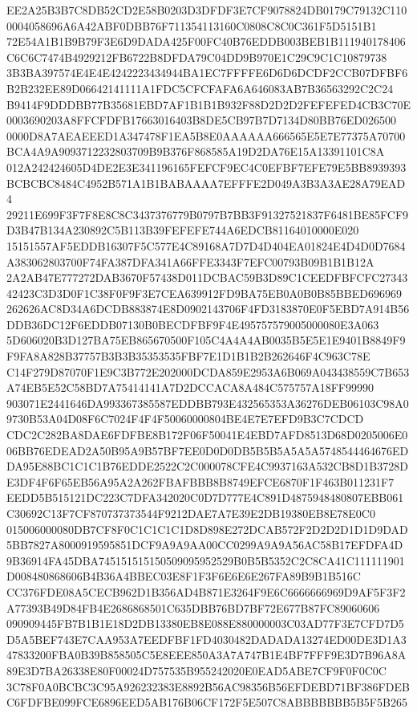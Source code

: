 \documentclass[UTF8,fontset=fandol,zihao=-4,a4paper]{ctexart}
\begin{document}
{{EE2A25B3B7C8DB52CD2E58B0203D3DFDF3E7CF9078824DB0179C79132C1100004058696A6A42ABF0DBB76F711354113160C0808C8C0C361F5D5151B1
72E54A1B1B9B79F3E6D9DADA425F00FC40B76EDDB003BEB1B111940178406C6C6C7474B4929212FB6722B8DFDA79C04DD9B970E1C29C9C1C10879738
3B3BA397574E4E4E4242223434944BA1EC7FFFFE6D6D6DCDF2CCB07DFBF6B2B232EE89D06642141111A1FDC5CFCFAFA6A646083AB7B36563292C2C24
B9414F9DDDBB77B35681EBD7AF1B1B1B932F88D2D2D2FEFEFED4CB3C70E0003690203A8FFCFDFB17663016403B8DE5CB97B7D7134D80BB76ED026500
0000D8A7AEAEEED1A347478F1EA5B8E0AAAAAA666565E5E7E77375A70700BCA4A9A9093712232803709B9B376F868585A19D2DA76E15A13391101C8A
012A242424605D4DE2E3E341196165FEFCF9EC4C0EFBF7EFE79E5BB8939393BCBCBC8484C4952B571A1B1BABAAAA7EFFFE2D049A3B3A3AE28A79EAD4
29211E699F3F7F8E8C8C3437376779B0797B7BB3F91327521837F6481BE85FCF9D3B47B134A230892C5B113B39FEFEFE744A6EDCB81164010000E020
15151557AF5EDDB16307F5C577E4C89168A7D7D4D404EA01824E4D4D0D7684A383062803700F74FA387DFA341A66FFE3343F7EFC00793B09B1B1B12A
2A2AB47E777272DAB3670F57438D011DCBAC59B3D89C1CEEDFBFCFC2734342423C3D3D0F1C38F0F9F3E7CEA639912FD9BA75EB0A0B0B85BBED696969
262626AC8D34A6DCDB883874E8D0902143706F4FD3183870E0F5EBD7A914B56DDB36DC12F6EDDB07130B0BECDFBF9F4E495757579005000080E3A063
5D606020B3D127BA75EB865670500F105C4A4A4AB0035B5E5E1E9401B8849F9F9FA8A828B37757B3B3B35353535FBF7E1D1B1B2B262646F4C963C78E
C14F279D87070F1E9C3B772E202000DCDA859E2953A6B069A043438559C7B653A74EB5E52C58BD7A75414141A7D2DCCACA8A484C575757A18FF99990
903071E2441646DA993367385587EDDBB793E432565353A36276DEB06103C98A09730B53A04D08F6C7024F4F4F50060000804BE4E7E7EFD9B3C7CDCD
CDC2C282BA8DAE6FDFBE8B172F06F50041E4EBD7AFD8513D68D0205006E006BB76EDEAD2A50B95A9B57BF7EE0D0D0DB5B5B5A5A5A5748544464676ED
DA95E88BC1C1C1B76EDDE2522C2C000078CFE4C9937163A532CB8D1B3728DE3DF4F6F65EB56A95A2A262FBAFBBB8B8749EFCE6870F1F463B011231F7
EEDD5B515121DC223C7DFA342020C0D7D777E4C891D4875948480807EBB061C30692C13F7CF870737373544F9212DAE7A7E39E2DB19380EB8E78E0C0
015006000080DB7CF8F0C1C1C1C1D8D898E272DCAB572F2D2D2D1D1D9DAD5BB7827A8000919595851DCF9A9A9AA00CC0299A9A9A56AC58B17EFDFA4D
9B36914FA45DBA745151515150509095952529B0B5B5352C2C8CA41C111111901D008480868606B4B36A4BBEC03E8F1F3F6E6E6E267FA89B9B1B516C
CC376FDE08A5CECB962D1B356AD4B871E3264F9E6C6666666969D9AF5F3F2A77393B49D84FB4E2686868501C635DBB76BD7BF72E677B87FC89060606
090909445FB7B1B1E18D2DB13380EB8E088E880000003C03AD77F3E7CFD7D5D5A5BEF743E7CAA953A7EEDFBF1FD4030482DADADA13274ED00DE3D1A3
47833200FBA0B39B858505C5E8EEE850A3A7A747B1E4BF7FFF9E3D7B96A8A89E3D7BA26338E80F00024D757535B955242020E0EAD5ABE7CF9F0F0C0C
3C78F0A0BCBC3C95A926232383E8892B56AC98356B56EFDEBD71BF386FDEBC6FDFBE099FCE6896EED5AB176B06CF172F5E507C8ABBBBBBB5B5F5B265
}}
\end{document}
